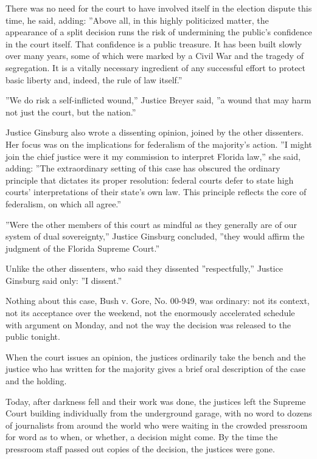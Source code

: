 There was no need for the court to have involved itself in the election
dispute this time, he said, adding: ''Above all, in this highly
politicized matter, the appearance of a split decision runs the risk of
undermining the public's confidence in the court itself. That confidence
is a public treasure. It has been built slowly over many years, some of
which were marked by a Civil War and the tragedy of segregation. It is a
vitally necessary ingredient of any successful effort to protect basic
liberty and, indeed, the rule of law itself.''

''We do risk a self-inflicted wound,'' Justice Breyer said, ''a wound
that may harm not just the court, but the nation.''

Justice Ginsburg also wrote a dissenting opinion, joined by the other
dissenters. Her focus was on the implications for federalism of the
majority's action. ''I might join the chief justice were it my
commission to interpret Florida law,'' she said, adding: ''The
extraordinary setting of this case has obscured the ordinary principle
that dictates its proper resolution: federal courts defer to state high
courts' interpretations of their state's own law. This principle
reflects the core of federalism, on which all agree.''

''Were the other members of this court as mindful as they generally are
of our system of dual sovereignty,'' Justice Ginsburg concluded, ''they
would affirm the judgment of the Florida Supreme Court.''

Unlike the other dissenters, who said they dissented ''respectfully,''
Justice Ginsburg said only: ''I dissent.''

Nothing about this case, Bush v. Gore, No. 00-949, was ordinary: not its
context, not its acceptance over the weekend, not the enormously
accelerated schedule with argument on Monday, and not the way the
decision was released to the public tonight.

When the court issues an opinion, the justices ordinarily take the bench
and the justice who has written for the majority gives a brief oral
description of the case and the holding.

Today, after darkness fell and their work was done, the justices left
the Supreme Court building individually from the underground garage,
with no word to dozens of journalists from around the world who were
waiting in the crowded pressroom for word as to when, or whether, a
decision might come. By the time the pressroom staff passed out copies
of the decision, the justices were gone.

